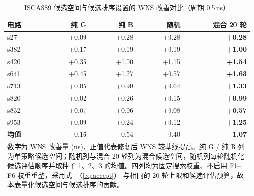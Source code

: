 \documentclass[twocolumn,10pt,fontset=windows]{ctexart}
\renewcommand{\eqref}[1]{\textup{（\ref{#1}）}}
\begin{document}
\begin{table}[H]
\centering
\caption{ISCAS89 候选空间与候选排序设置的 WNS 改善对比（周期 0.5\,ns）}
\label{tab:ablation}
\scriptsize
\setlength{\tabcolsep}{3pt}
\begin{tabular}{lrrrr}
\toprule
\textbf{电路} & \textbf{纯 G} & \textbf{纯 B} & \textbf{随机} & \textbf{混合 20 轮} \\
\midrule
s27  & +0.09 & +0.28 & +0.28 & \textbf{+0.28} \\
s382 & +0.17 & +0.19 & +0.19 & \textbf{+1.00} \\
s420 & +0.35 & +1.00 & +1.15 & \textbf{+1.54} \\
s641 & +0.45 & +1.27 & +0.57 & \textbf{+1.63} \\
s713 & +0.05 & +0.99 & +0.64 & \textbf{+1.33} \\
s820 & +0.02 & +0.26 & +0.15 & \textbf{+0.99} \\
s832 & +0.07 & +0.06 & +0.08 & \textbf{+0.57} \\
s953 & +0.09 & +0.24 & +0.12 & \textbf{+1.25} \\
\midrule
\textbf{均值} & 0.16 & 0.54 & 0.40 & \textbf{1.07} \\
\bottomrule
\multicolumn{5}{p{0.92\columnwidth}}{\footnotesize 数字为 WNS 改善量 (ns)，正值代表修复后 WNS 较基线提高。纯 G / 纯 B 列为单策略候选空间；随机列与混合 20 轮列为混合候选空间，随机列每轮随机化候选评估顺序并取种子 1、2、3 的均值。四列均为固定搜索权重、不启用 F1--F6 权重重整，采用式~\eqref{eq:accept} 与相同的 20 轮上限和候选评估预算，故本表量化候选空间与候选排序的贡献。} \\
\end{tabular}
\end{table}
\end{document}
